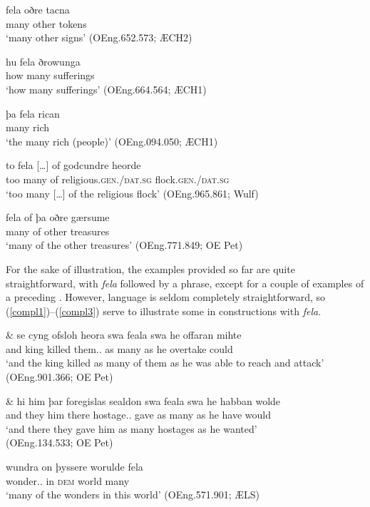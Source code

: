 \documentclass[output=paper,colorlinks,citecolor=brown]{langscibook}
\begin{document}
\ea\label{misc1}
\gll fela oðre tacna\\
	many other tokens\\
\glt ‘many other signs’ (OEng.652.573; ÆCH2)
\z

\ea\label{misc2}
\gll hu fela ðrowunga\\
how many sufferings\\
\glt ‘how many sufferings’ (OEng.664.564; ÆCH1)
\z

\ea\label{misc3}
\gll þa fela rican\\
\DEF{} many rich\\
\glt ‘the many rich (people)’ (OEng.094.050; ÆCH1)
\z

\ea\label{misc4}
\gll to fela […] of godcundre heorde\\
too many {} of religious.\textsc{gen./dat.sg} flock.\textsc{gen./dat.sg}\\
\glt ‘too many […] of the religious flock’ (OEng.965.861; Wulf)
\z

\ea\label{misc5}
\gll fela of þa oðre gærsume\\
many of \DEF{} other treasures\\
\glt ‘many of the other treasures’ (OEng.771.849; OE Pet)
\z

For the sake of illustration, the examples provided so far are quite straightforward, with \textit{fela} followed by a  phrase, except for a couple of examples of a preceding . However, language is seldom completely straightforward, so (\ref{compl1})–(\ref{compl3}) serve to illustrate some  in constructions with \textit{fela}. 

\ea\label{compl1}
\gll \& se cyng ofsloh heora swa feala swa he offaran mihte\\
	and \DEF{} king killed them.\GEN.\PL{} as many as he overtake could\\
\glt ‘and the king killed as many of them as he was able to reach and attack’ (OEng.901.366; OE Pet)
\z


\ea\label{compl2}
\gll \& hi him þar foregislas sealdon swa feala swa he habban wolde\\
	and they him there hostage.\ACC.\PL{} gave as many as he have would\\
\glt‘and there they gave him as many hostages as he wanted’ \\ (OEng.134.533; OE Pet)
\z

\ea\label{compl3}
\gll wundra on þyssere worulde fela\\
wonder.\GEN.\PL{} in \textsc{dem} world many\\
\glt ‘many of the wonders in this world’ (OEng.571.901; ÆLS)
\z
\end{document}
